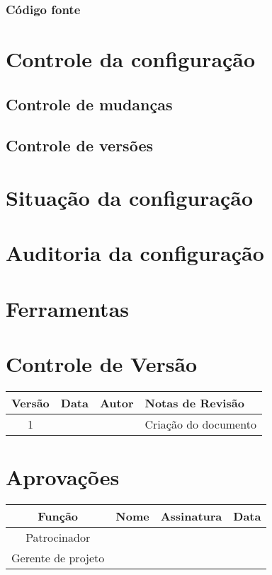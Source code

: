 \subsubsection{Código fonte}

\section{Controle da configuração}

\subsection{Controle de mudanças}

\subsection{Controle de versões}

\section{Situação da configuração}

\section{Auditoria da configuração}

\section{Ferramentas}

\section{Controle de Versão}

\begin{table}[H]
	\begin{tabularx}{\textwidth}{| c | c | X | X |}
		\hline
		\textbf{Versão} & \textbf{Data} & \textbf{Autor}      & \textbf{Notas de Revisão} \\
		\hline
		1                &               & \projectManagerName{} & Criação do documento     \\
		\hline
	\end{tabularx}
	\centering
\end{table}

\section{Aprovações}

\begin{table}[H]
	\begin{tabularx}{\textwidth}{| c | c | X | c |}
		\hline
		\textbf{Função}  & \textbf{Nome}       & \textbf{Assinatura}      & \textbf{Data} \\
		\hline
		Patrocinador       & \projectSponsorName{} & \projectSponsorSignature{} &               \\
		\hline
		Gerente de projeto & \projectManagerName{} & \projectManagerSignature{} &               \\
		\hline
	\end{tabularx}
	\centering
\end{table}